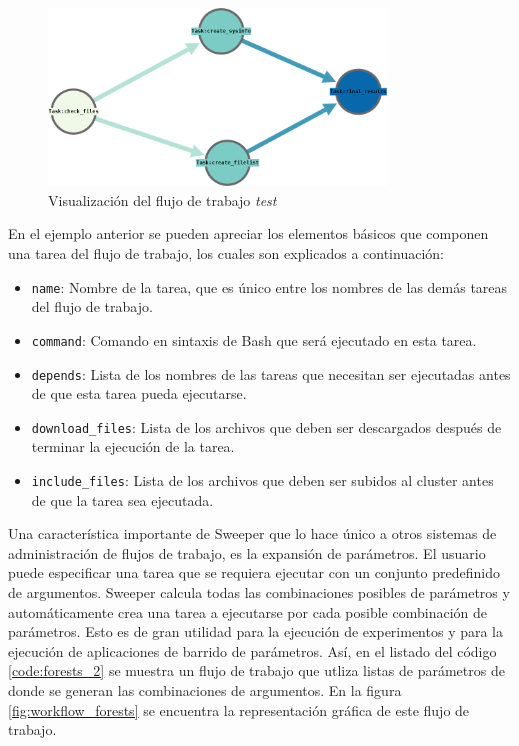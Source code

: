 \begin{figure}
\begin{center}
\includegraphics[width=0.8\textwidth]{imagenes/workflow_test.png}
\end{center}
\caption{Visualización del flujo de trabajo \emph{test} }
\label{fig:workflow_test}
\end{figure}


En el ejemplo anterior se pueden apreciar los elementos básicos que componen una tarea del flujo de trabajo, los cuales son explicados a continuación:


\begin{itemize}
\item{\texttt{name}: Nombre de la tarea, que es único entre los nombres de las demás tareas del flujo de trabajo.}
\item{\texttt{command}: Comando en sintaxis de Bash que será ejecutado en esta tarea.}
\item{\texttt{depends}: Lista de los nombres de las tareas que necesitan ser ejecutadas antes de que esta tarea pueda ejecutarse.}
\item{\texttt{download\_files}: Lista de los archivos que deben ser descargados después de terminar la ejecución de la tarea.}
\item{\texttt{include\_files}: Lista de los archivos que deben ser subidos al cluster antes de que la tarea sea ejecutada.}
\end{itemize}

Una característica importante de Sweeper que lo hace único a otros sistemas de administración de flujos de trabajo, es la expansión de parámetros. El usuario puede especificar una tarea que se requiera ejecutar con un conjunto predefinido de argumentos. Sweeper calcula todas las combinaciones posibles de parámetros y automáticamente crea una tarea a ejecutarse por cada posible combinaci\'on de parámetros. Esto es de gran utilidad para la ejecución de experimentos y para la ejecución de aplicaciones de barrido de parámetros. Así, en el listado del código \ref{code:forests_2} se muestra un flujo de trabajo que utliza listas de parámetros de donde se generan las combinaciones de argumentos. En la figura \ref{fig:workflow_forests} se encuentra la representación gr\'afica de este flujo de trabajo.

